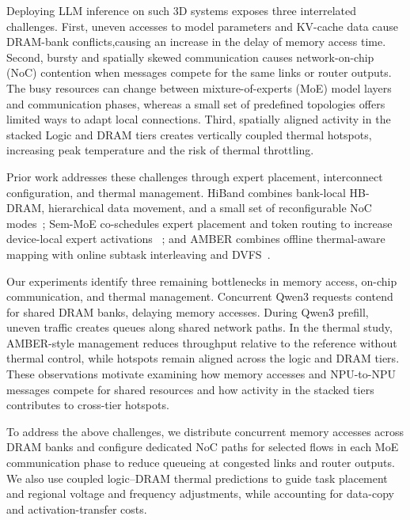 \documentclass[conference,10pt]{IEEEtran}
\begin{document}
Deploying LLM inference on such 3D systems exposes three interrelated
challenges. First, uneven accesses to model parameters and KV-cache data cause
DRAM-bank conflicts,causing an increase in the delay of memory access time. Second, bursty and spatially skewed communication causes
network-on-chip (NoC) contention when messages compete for the same links or
router outputs. The busy resources can change between mixture-of-experts
(MoE) model layers and communication phases, whereas a small set of
predefined topologies offers limited ways to adapt local connections. Third, spatially aligned activity in the stacked Logic and DRAM tiers
creates vertically coupled thermal hotspots, increasing peak temperature and
the risk of thermal throttling.

Prior work addresses these challenges through expert placement, interconnect
configuration, and thermal management. HiBand
combines bank-local HB-DRAM, hierarchical data movement, and a small set of
reconfigurable NoC modes~\cite{wang2026hiband}; Sem-MoE co-schedules expert
placement and token routing to increase device-local expert activations
~\cite{li2026semantic}; and AMBER combines offline thermal-aware mapping with
online subtask interleaving and DVFS~\cite{lin2026amber}. 


Our experiments identify three remaining bottlenecks in memory access,
on-chip communication, and thermal management. Concurrent Qwen3 requests
contend for shared DRAM banks, delaying memory accesses. During Qwen3
prefill, uneven traffic creates queues along shared network paths.
In the thermal study, AMBER-style management reduces throughput relative
to the reference without thermal control, while hotspots remain aligned
across the logic and DRAM tiers. These observations motivate examining how
memory accesses and NPU-to-NPU messages compete for shared resources and
how activity in the stacked tiers contributes to cross-tier hotspots.

To address the above challenges, we distribute concurrent memory accesses
across DRAM banks and configure dedicated NoC paths for selected flows
in each MoE communication phase to reduce queueing at congested links
and router outputs. We also use coupled logic--DRAM thermal predictions
to guide task placement and regional voltage and frequency adjustments,
while accounting for data-copy and activation-transfer costs.
\end{document}

